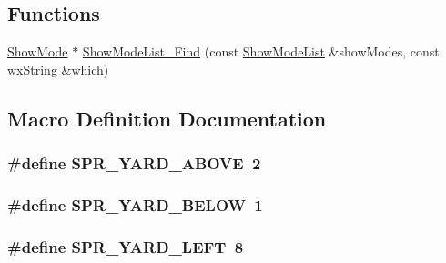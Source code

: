 \subsection*{Functions}
\begin{DoxyCompactItemize}
\item 
\hyperlink{a00140}{Show\-Mode} $\ast$ \hyperlink{a00236_afa24aef33f76cbcb08077f91f5668865}{Show\-Mode\-List\-\_\-\-Find} (const \hyperlink{a00236_a39f2aa1ac0d2da59ef7f3e58b13f44d2}{Show\-Mode\-List} \&show\-Modes, const wx\-String \&which)
\end{DoxyCompactItemize}


\subsection{Macro Definition Documentation}
\hypertarget{a00236_a57db2273220cd4bde69fcafb32a03726}{
\subsubsection[{S\-P\-R\-\_\-\-Y\-A\-R\-D\-\_\-\-A\-B\-O\-V\-E}]{\setlength{\rightskip}{0pt plus 5cm}\#define S\-P\-R\-\_\-\-Y\-A\-R\-D\-\_\-\-A\-B\-O\-V\-E~2}}\label{a00236_a57db2273220cd4bde69fcafb32a03726}
\hypertarget{a00236_a3f125f7e7a83ca8c9d363185c713578a}{
\subsubsection[{S\-P\-R\-\_\-\-Y\-A\-R\-D\-\_\-\-B\-E\-L\-O\-W}]{\setlength{\rightskip}{0pt plus 5cm}\#define S\-P\-R\-\_\-\-Y\-A\-R\-D\-\_\-\-B\-E\-L\-O\-W~1}}\label{a00236_a3f125f7e7a83ca8c9d363185c713578a}
\hypertarget{a00236_a6b0901343c2eaff1df4a95fc4dd2cae9}{
\subsubsection[{S\-P\-R\-\_\-\-Y\-A\-R\-D\-\_\-\-L\-E\-F\-T}]{\setlength{\rightskip}{0pt plus 5cm}\#define S\-P\-R\-\_\-\-Y\-A\-R\-D\-\_\-\-L\-E\-F\-T~8}}\label{a00236_a6b0901343c2eaff1df4a95fc4dd2cae9}
